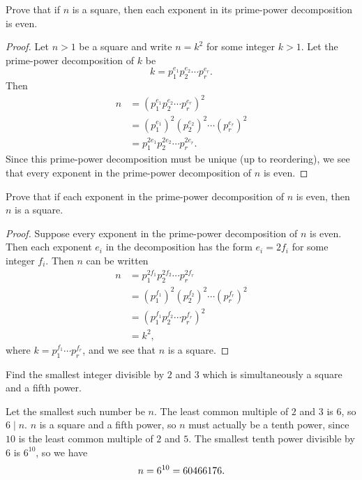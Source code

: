  Prove that if $n$ is a square, then each exponent in its
prime-power decomposition is even.
\begin{proof}
  Let $n>1$ be a square and write $n = k^2$ for some integer
  $k>1$. Let the prime-power decomposition of $k$ be
  \begin{equation*}
    k = p_1^{e_1}p_2^{e_2}\cdots p_r^{e_r}.
  \end{equation*}
  Then
  \begin{align*}
    n &= (p_1^{e_1}p_2^{e_2}\cdots p_r^{e_r})^2 \\
      &= (p_1^{e_1})^2(p_2^{e_2})^2\cdots(p_r^{e_r})^2 \\
      &= p_1^{2e_1}p_2^{2e_2}\cdots p_r^{2e_r}.
  \end{align*}
  Since this prime-power decomposition must be unique (up to
  reordering), we see that every exponent in the prime-power
  decomposition of $n$ is even.
\end{proof}

 Prove that if each exponent in the prime-power decomposition
of $n$ is even, then $n$ is a square.
\begin{proof}
  Suppose every exponent in the prime-power decomposition of $n$ is
  even. Then each exponent $e_i$ in the decomposition has the form
  $e_i = 2f_i$ for some integer $f_i$. Then $n$ can be written
  \begin{align*}
    n &= p_1^{2f_1}p_2^{2f_2}\cdots p_r^{2f_r} \\
      &= (p_1^{f_1})^2(p_2^{f_2})^2\cdots(p_r^{f_r})^2 \\
      &= (p_1^{f_1}p_2^{f_2}\cdots p_r^{f_r})^2 \\
      &= k^2,
  \end{align*}
  where $k = p_1^{f_1}\cdots p_r^{f_r}$, and we see that $n$ is a
  square.
\end{proof}

 Find the smallest integer divisible by $2$ and $3$ which is
simultaneously a square and a fifth power.
\begin{solution}
  Let the smallest such number be $n$. The least common multiple of
  $2$ and $3$ is $6$, so $6\mid n$. $n$ is a square and a fifth power,
  so $n$ must actually be a tenth power, since $10$ is the least
  common multiple of $2$ and $5$. The smallest tenth power divisible
  by $6$ is $6^{10}$, so we have
  \begin{equation*}
    n = 6^{10} = 60466176. \qedhere
  \end{equation*}
\end{solution}
